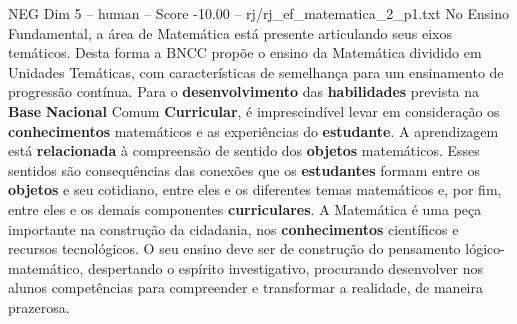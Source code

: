 \begin{textsample}{NEG Dim 5 – human – Score -10.00 – rj/rj\_ef\_matematica\_2\_p1.txt}  \label{ex:f5_neg_012}
No Ensino Fundamental, a área de Matemática está presente articulando seus eixos temáticos.
Desta forma a BNCC propõe o ensino da Matemática dividido em Unidades Temáticas, com características de semelhança para um ensinamento de progressão contínua.
Para o \textbf{desenvolvimento} das \textbf{habilidades} prevista na \textbf{Base} \textbf{Nacional} Comum \textbf{Curricular}, é imprescindível levar em consideração os \textbf{conhecimentos} matemáticos e as experiências do \textbf{estudante}.
A aprendizagem está \textbf{relacionada} à compreensão de sentido dos \textbf{objetos} matemáticos.
Esses sentidos são consequências das conexões que os \textbf{estudantes} formam entre os \textbf{objetos} e seu cotidiano, entre eles e os diferentes temas matemáticos e, por fim, entre eles e os demais componentes \textbf{curriculares}.
A Matemática é uma peça importante na construção da cidadania, nos \textbf{conhecimentos} científicos e recursos tecnológicos.
O seu ensino deve ser de construção do pensamento lógico-matemático, despertando o espírito investigativo, procurando desenvolver nos alunos competências para compreender e transformar a realidade, de maneira prazerosa.

\end{textsample}
